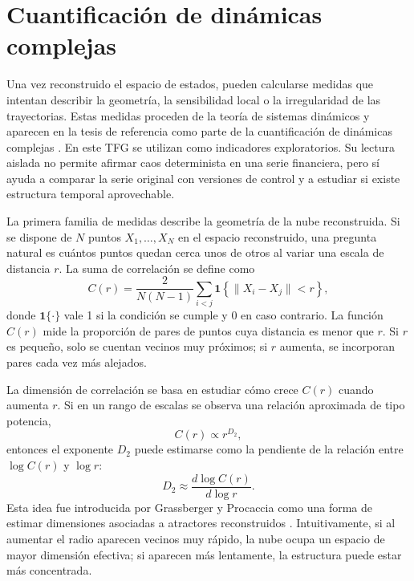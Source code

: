 \section{Cuantificación de dinámicas complejas}\label{sec:cuantificacion-dinamicas}

Una vez reconstruido el espacio de estados, pueden calcularse medidas que intentan describir la geometría, la sensibilidad local o la irregularidad de las trayectorias. Estas medidas proceden de la teoría de sistemas dinámicos y aparecen en la tesis de referencia como parte de la cuantificación de dinámicas complejas \cite{olmedo2001}. En este TFG se utilizan como indicadores exploratorios. Su lectura aislada no permite afirmar caos determinista en una serie financiera, pero sí ayuda a comparar la serie original con versiones de control y a estudiar si existe estructura temporal aprovechable.

La primera familia de medidas describe la geometría de la nube reconstruida. Si se dispone de \(N\) puntos \(X_1,\ldots,X_N\) en el espacio reconstruido, una pregunta natural es cuántos puntos quedan cerca unos de otros al variar una escala de distancia \(r\). La suma de correlación se define como
\begin{equation}
    C(r)=\frac{2}{N(N-1)}
    \sum_{i<j}\mathbf{1}\left\{\|X_i-X_j\|<r\right\},
\end{equation}
donde \(\mathbf{1}\{\cdot\}\) vale 1 si la condición se cumple y 0 en caso contrario. La función \(C(r)\) mide la proporción de pares de puntos cuya distancia es menor que \(r\). Si \(r\) es pequeño, solo se cuentan vecinos muy próximos; si \(r\) aumenta, se incorporan pares cada vez más alejados.

La dimensión de correlación se basa en estudiar cómo crece \(C(r)\) cuando aumenta \(r\). Si en un rango de escalas se observa una relación aproximada de tipo potencia,
\begin{equation}
    C(r) \propto r^{D_2},
\end{equation}
entonces el exponente \(D_2\) puede estimarse como la pendiente de la relación entre \(\log C(r)\) y \(\log r\):
\begin{equation}
    D_2 \approx \frac{d\log C(r)}{d\log r}.
\end{equation}
Esta idea fue introducida por Grassberger y Procaccia como una forma de estimar dimensiones asociadas a atractores reconstruidos \cite{grassberger1983}. Intuitivamente, si al aumentar el radio aparecen vecinos muy rápido, la nube ocupa un espacio de mayor dimensión efectiva; si aparecen más lentamente, la estructura puede estar más concentrada.

